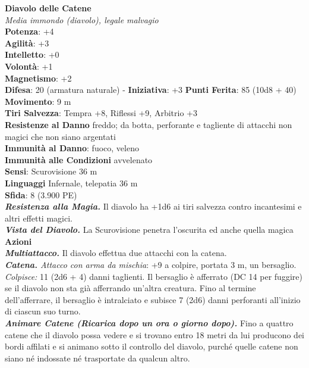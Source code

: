 \begin{multicols}{2}
\medskip\textbf{Diavolo delle Catene}\\
\emph{Media immondo (diavolo), legale malvagio}\\
\textbf{Potenza}: +4\\
\textbf{Agilità}: +3\\
\textbf{Intelletto}: +0\\
\textbf{Volontà}: +1\\
\textbf{Magnetismo}: +2\\
\textbf{Difesa}: 20 (armatura naturale) - \textbf{Iniziativa}: +3
\textbf{Punti Ferita}: 85 (10d8 + 40)\\
\textbf{Movimento}: 9 m\\
\textbf{Tiri Salvezza}: Tempra +8, Riflessi +9, Arbitrio +3\\
\textbf{Resistenze al Danno} freddo; da botta, perforante e tagliente di attacchi non magici che non siano argentati\\
\textbf{Immunità al Danno}: fuoco, veleno\\
\textbf{Immunità alle Condizioni} avvelenato\\
\textbf{Sensi}: Scurovisione 36 m\\
\textbf{Linguaggi} Infernale, telepatia 36 m \\
\textbf{Sfida}: 8 (3.900 PE)\smallskip\\
\emph{\textbf{Resistenza alla Magia.}} Il diavolo ha +1d6 ai tiri salvezza contro incantesimi e altri effetti magici.\\
\emph{\textbf{Vista del Diavolo.}} La Scurovisione penetra l'oscurita ed anche quella magica\\
\smallskip\textbf{Azioni}\\
\emph{\textbf{Multiattacco.}} Il diavolo effettua due attacchi con la catena.\\
\emph{\textbf{Catena.} Attacco con arma da mischia}: +9 a colpire, portata 3 m, un bersaglio.\\
\emph{Colpisce:} 11 (2d6 + 4) danni taglienti. Il bersaglio è afferrato (DC 14 per fuggire) se il diavolo non sta già afferrando un'altra creatura. Fino al termine dell'afferrare, il bersaglio è intralciato e subisce 7 (2d6) danni perforanti all'inizio di ciascun suo turno.\\
\emph{\textbf{Animare Catene (Ricarica dopo un ora o giorno dopo).}} Fino a quattro catene che il diavolo possa vedere e si trovano entro 18 metri da lui producono dei bordi affilati e si animano sotto il controllo del diavolo, purché quelle catene non siano né indossate né trasportate da qualcun altro.\\

\end{multicols}
